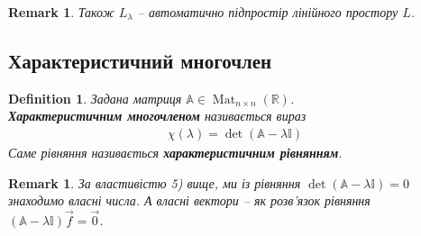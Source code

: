 \documentclass[a4paper, 10pt]{article}
\theoremstyle{theoremdd}
\newtheorem{definition}[theorem]{Definition}
\newtheorem{remark}[theorem]{Remark}
\DeclareMathOperator{\Mat}{Mat}
\begin{document}
\begin{remark}
\label{eigenspace_is_subspace}
Також $L_\lambda$ -- автоматично підпростір лінійного простору $L$.
\end{remark}

\subsection{Характеристичний многочлен}
\begin{definition}
Задана матриця $\mathbb{A} \in \Mat_{n \times n}(\mathbb{R})$.\\
\textbf{Характеристичним многочленом} називається вираз
\begin{align*}
\chi(\lambda) = \det(\mathbb{A} - \lambda \mathbb{I})
\end{align*}
Саме рівняння називається \textbf{характеристичним рівнянням}.
\end{definition}

\begin{remark}
За властивістю 5) вище, ми із рівняння $\det (\mathbb{A} - \lambda \mathbb{I}) = 0$ знаходимо власні числа. А власні вектори -- як розв'язок рівняння $(\mathbb{A} - \lambda \mathbb{I})\vec{f} = \vec{0}$.
\end{remark}
\end{document}
